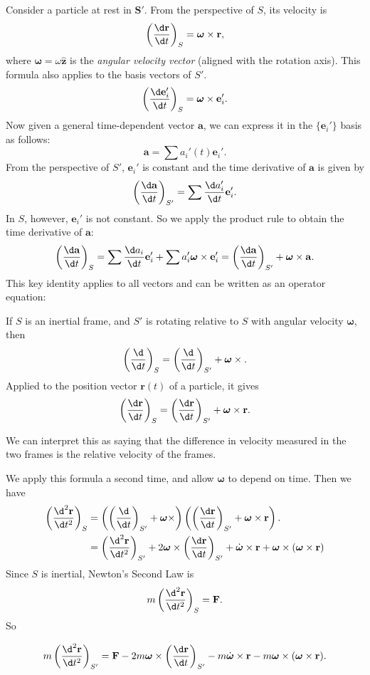 \documentclass[a4paper]{article}
\begin{document}
Consider a particle at rest in $\mathbf{S}'$. From the perspective of $S$, its velocity is
\[
  \left(\frac{\d \mathbf{r}}{\d t}\right)_S = \boldsymbol\omega\times \mathbf{r},
\]
where $\boldsymbol\omega = \omega\hat{\mathbf{z}}$ is the \emph{angular velocity vector} (aligned with the rotation axis). This formula also applies to the basis vectors of $S'$.
\[
  \left(\frac{\d \mathbf{e}_i'}{\d t}\right)_S = \boldsymbol\omega\times \mathbf{e}_i'.
\]
Now given a general time-dependent vector $\mathbf{a}$, we can express it in the $\{\mathbf{e}_i'\}$ basis as follows:
\[
  \mathbf{a} = \sum a_i'(t) \mathbf{e}_i'.
\]
From the perspective of $S'$, $\mathbf{e}_i'$ is constant and the time derivative of $\mathbf{a}$ is given by
\[
  \left(\frac{\d \mathbf{a}}{\d t}\right)_{S'} = \sum \frac{\d a_i'}{\d t}\mathbf{e}_i'.
\]
In $S$, however, $\mathbf{e}_i'$ is not constant. So we apply the product rule to obtain the time derivative of $\mathbf{a}$:
\[
  \left(\frac{\d \mathbf{a}}{\d t}\right)_S = \sum \frac{\d a_i}{\d t}\mathbf{e}_i' + \sum a_i'\boldsymbol\omega \times \mathbf{e}_i' = \left(\frac{\d \mathbf{a}}{\d t}\right)_{S'} + \boldsymbol\omega \times \mathbf{a}.
\]
This key identity applies to all vectors and can be written as an operator equation:
\begin{prop}
  If $S$ is an inertial frame, and $S'$ is rotating relative to $S$ with angular velocity $\boldsymbol \omega$, then
  \[
    \left(\frac{\d}{\d t}\right)_S = \left(\frac{\d}{\d t}\right)_{S'} + \boldsymbol\omega \times.
  \]
  Applied to the position vector $\mathbf{r}(t)$ of a particle, it gives
  \[
    \left(\frac{\d \mathbf{r}}{\d t}\right)_S = \left(\frac{\d \mathbf{r}}{\d t}\right)_{S'} + \boldsymbol\omega \times \mathbf{r}.
  \]
\end{prop}
We can interpret this as saying that the difference in velocity measured in the two frames is the relative velocity of the frames.

We apply this formula a second time, and allow $\boldsymbol\omega$ to depend on time. Then we have
\begin{align*}
  \left(\frac{\d ^2\mathbf{r}}{\d t^2}\right)_S &= \left(\left(\frac{\d }{\d t}\right)_{S'} + \boldsymbol\omega\times \right)\left(\left(\frac{\d \mathbf{r}}{\d t}\right)_{S'} + \boldsymbol\omega \times \mathbf{r}\right).\\
  &= \left(\frac{\d^2 \mathbf{r}}{\d t^2}\right)_{S'} + 2\boldsymbol \omega \times \left(\frac{\d \mathbf{r}}{\d t}\right)_{S'} + \dot{\boldsymbol\omega} \times \mathbf{r} + \boldsymbol\omega\times(\boldsymbol\omega\times \mathbf{r})
\end{align*}
Since $S$ is inertial, Newton's Second Law is
\[
  m\left(\frac{\d ^2\mathbf{r}}{\d t^2}\right)_S = \mathbf{F}.
\]
So
\begin{prop}
  \[
    m\left(\frac{\d^2 \mathbf{r}}{\d t^2}\right)_{S'} = \mathbf{F} - 2m\boldsymbol\omega \times \left(\frac{\d \mathbf{r}}{\d t}\right)_{S'} - m\dot{\boldsymbol\omega}\times \mathbf{r} - m\boldsymbol\omega \times (\boldsymbol\omega \times \mathbf{r}).
  \]
\end{prop}
\end{document}
